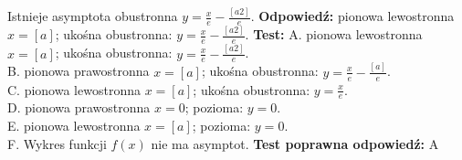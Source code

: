 \documentclass[12pt, a4paper]{article}
\theoremstyle{definition} %
\newcommand{\rozwStop}{\newline}                                            %
\newcommand{\odpStart}{\noindent \textbf{Odpowiedź:}\newline}    %
\newcommand{\odpStop}{\newline}                                             %
\newcommand{\testStart}{\noindent \textbf{Test:}\newline} %
\newcommand{\testStop}{\newline} %
\newcommand{\kluczStart}{\noindent \textbf{Test poprawna odpowiedź:}\newline} %
\newcommand{\kluczStop}{\newline} %
\begin{document}
Istnieje asymptota obustronna $y=\frac{x}{e}-\frac{[a2]}{e}$.
\rozwStop
\odpStart
pionowa lewostronna $x=[a]$; ukośna obustronna: $y=\frac{x}{e}-\frac{[a2]}{e}$.
\odpStop
\testStart
A. pionowa lewostronna $x=[a]$; ukośna obustronna: $y=\frac{x}{e}-\frac{[a2]}{e}$.\\
B. pionowa prawostronna $x=[a]$; ukośna obustronna: $y=\frac{x}{e}-\frac{[a]}{e}$.\\
C. pionowa lewostronna $x=[a]$; ukośna obustronna: $y=\frac{x}{e}$.\\
D. pionowa prawostronna $x=0$; pozioma: $y=0$.\\
E. pionowa lewostronna $x=[a]$; pozioma: $y=0$.\\
F. Wykres funkcji $f(x)$ nie ma asymptot.
\testStop
\kluczStart
A
\kluczStop
\end{document}
